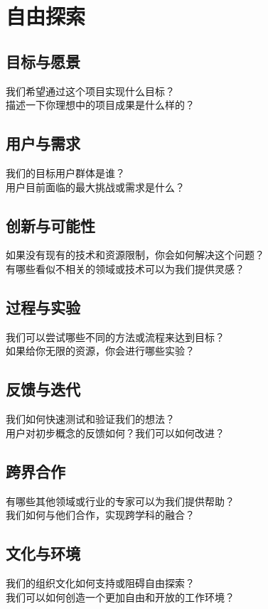 \documentclass[12pt]{book}
\begin{document}
\section{自由探索}
\subsection{目标与愿景}
我们希望通过这个项目实现什么目标？\\
描述一下你理想中的项目成果是什么样的？\\

\subsection{用户与需求}
我们的目标用户群体是谁？\\
用户目前面临的最大挑战或需求是什么？\\

\subsection{创新与可能性}
如果没有现有的技术和资源限制，你会如何解决这个问题？\\
有哪些看似不相关的领域或技术可以为我们提供灵感？\\

\subsection{过程与实验}
我们可以尝试哪些不同的方法或流程来达到目标？\\
如果给你无限的资源，你会进行哪些实验？\\

\subsection{反馈与迭代}
我们如何快速测试和验证我们的想法？\\
用户对初步概念的反馈如何？我们可以如何改进？\\

\subsection{跨界合作}
有哪些其他领域或行业的专家可以为我们提供帮助？\\
我们如何与他们合作，实现跨学科的融合？\\

\subsection{文化与环境}
我们的组织文化如何支持或阻碍自由探索？\\
我们可以如何创造一个更加自由和开放的工作环境？\\
\end{document}
